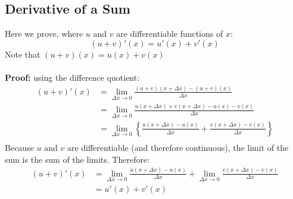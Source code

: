 \documentclass{report}
\begin{document}
\subsection{Derivative of a Sum}%
Here we prove, where $u$ and $v$ are differentiable functions of $x$:
\begin{equation*}
(u+v)'(x)=u'(x)+v'(x)
\end{equation*}
Note that $(u+v)(x)=u(x)+v(x)$\\
\vspace{2mm}\\
\textbf{Proof:} using the difference quotient:
\begin{align*}
(u+v)'(x)&=\lim_{\Delta x\to 0}\frac{(u+v)(x+\Delta x)-(u+v)(x)}{\Delta x}\\
&=\lim_{\Delta x\to 0}\frac{u(x+\Delta x)+v(x+\Delta x)-u(x)-v(x)}{\Delta x}\\
&=\lim_{\Delta x\to 0}\left\{\frac{u(x+\Delta x)-u(x)}{\Delta x}+
\frac{v(x+\Delta x)-v(x)}{\Delta x}\right\}\\
\end{align*}
Because $u$ and $v$ are differentiable (and therefore continuous), the limit of the sum is the
sum of the limits. Therefore:
\begin{align*}
(u+v)'(x)&=\lim_{\Delta x\to 0}\frac{u(x+\Delta x)-u(x)}{\Delta x}
+\lim_{\Delta x\to 0}\frac{v(x+\Delta x)-v(x)}{\Delta x}\\
&=u'(x)+v'(x)
\end{align*}
\newpage
\end{document}
